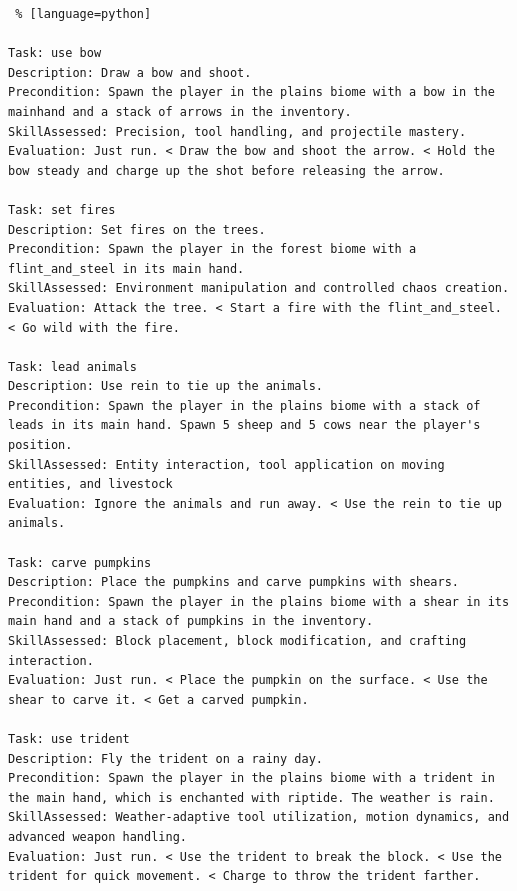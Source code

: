 \begin{lstlisting} % [language=python]  

Task: use bow
Description: Draw a bow and shoot. 
Precondition: Spawn the player in the plains biome with a bow in the mainhand and a stack of arrows in the inventory. 
SkillAssessed: Precision, tool handling, and projectile mastery.
Evaluation: Just run. < Draw the bow and shoot the arrow. < Hold the bow steady and charge up the shot before releasing the arrow.  

Task: set fires
Description: Set fires on the trees. 
Precondition: Spawn the player in the forest biome with a flint_and_steel in its main hand. 
SkillAssessed: Environment manipulation and controlled chaos creation.
Evaluation: Attack the tree. < Start a fire with the flint_and_steel. < Go wild with the fire. 

Task: lead animals
Description: Use rein to tie up the animals. 
Precondition: Spawn the player in the plains biome with a stack of leads in its main hand. Spawn 5 sheep and 5 cows near the player's position. 
SkillAssessed: Entity interaction, tool application on moving entities, and livestock 
Evaluation: Ignore the animals and run away. < Use the rein to tie up animals. 

Task: carve pumpkins
Description: Place the pumpkins and carve pumpkins with shears.
Precondition: Spawn the player in the plains biome with a shear in its main hand and a stack of pumpkins in the inventory. 
SkillAssessed: Block placement, block modification, and crafting interaction.
Evaluation: Just run. < Place the pumpkin on the surface. < Use the shear to carve it. < Get a carved pumpkin. 

Task: use trident
Description: Fly the trident on a rainy day. 
Precondition: Spawn the player in the plains biome with a trident in the main hand, which is enchanted with riptide. The weather is rain. 
SkillAssessed: Weather-adaptive tool utilization, motion dynamics, and advanced weapon handling.
Evaluation: Just run. < Use the trident to break the block. < Use the trident for quick movement. < Charge to throw the trident farther. 

\end{lstlisting}


